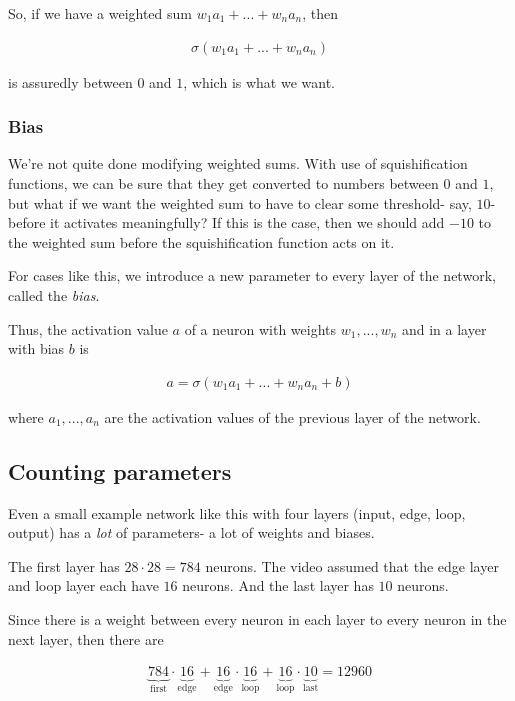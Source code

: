 \documentclass{article}
\begin{document}
	So, if we have a weighted sum $w_1 a_1 + ... + w_n a_n$, then
	
	\begin{align*}
		\sigma(w_1 a_1 + ... + w_n a_n)
	\end{align*}
	
	is assuredly between $0$ and $1$, which is what we want.
	
	
	\subsubsection*{Bias}
	
	We're not quite done modifying weighted sums. With use of squishification functions, we can be sure that they get converted to numbers between $0$ and $1$, but what if we want the weighted sum to have to clear some threshold- say, $10$- before it activates meaningfully? If this is the case, then we should add $-10$ to the weighted sum before the squishification function acts on it.
	
	For cases like this, we introduce a new parameter to every layer of the network, called the \textit{bias}.
	
	Thus, the activation value $a$ of a neuron with weights $w_1, ..., w_n$ and in a layer with bias $b$ is
	
	\begin{align*}
		a = \sigma(w_1 a_1 + ... + w_n a_n + b)
	\end{align*}
	
	where $a_1, ..., a_n$ are the activation values of the previous layer of the network.
	
	\subsection*{Counting parameters}
	
	Even a small example network like this with four layers (input, edge, loop, output) has a \textit{lot} of parameters- a lot of weights and biases.
	
	The first layer has $28 \cdot 28 = 784$ neurons. The video assumed that the edge layer and loop layer each have $16$ neurons. And the last layer has $10$ neurons.
	
	Since there is a weight between every neuron in each layer to every neuron in the next layer, then there are
	
	\begin{align*}
		\underbrace{784}_{\text{first}} \cdot \underbrace{16}_{\text{edge}} + \underbrace{16}_{\text{edge}} \cdot \underbrace{16}_{\text{loop}} + \underbrace{16}_{\text{loop}} \cdot \underbrace{10}_{\text{last}} = 12960
	\end{align*}
	
\end{document}
